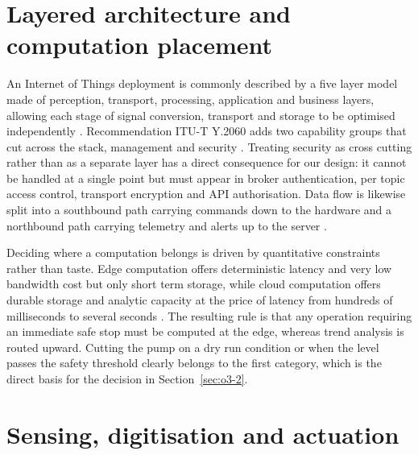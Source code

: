 \section{Layered architecture and computation placement}
\label{sec:o2-2}

An Internet of Things deployment is commonly described by a five layer model made of perception, transport, processing, application and business layers, allowing each stage of signal conversion, transport and storage to be optimised independently \cite{slide01}. Recommendation ITU-T Y.2060 adds two capability groups that cut across the stack, management and security \cite{itu2060}. Treating security as cross cutting rather than as a separate layer has a direct consequence for our design: it cannot be handled at a single point but must appear in broker authentication, per topic access control, transport encryption and API authorisation. Data flow is likewise split into a southbound path carrying commands down to the hardware and a northbound path carrying telemetry and alerts up to the server \cite{slide01}.

Deciding where a computation belongs is driven by quantitative constraints rather than taste. Edge computation offers deterministic latency and very low bandwidth cost but only short term storage, while cloud computation offers durable storage and analytic capacity at the price of latency from hundreds of milliseconds to several seconds \cite{slide01}. The resulting rule is that any operation requiring an immediate safe stop must be computed at the edge, whereas trend analysis is routed upward. Cutting the pump on a dry run condition or when the level passes the safety threshold clearly belongs to the first category, which is the direct basis for the decision in Section~\ref{sec:o3-2}.

\section{Sensing, digitisation and actuation}
\label{sec:o2-3}

